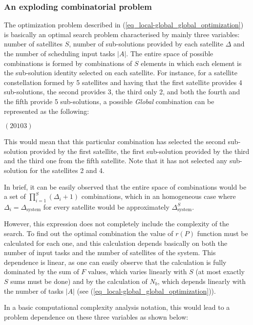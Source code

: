 \subsubsection{An exploding combinatorial problem}

The optimization problem described in (\ref{eq_local-global_global_optimization}) is basically an optimal search problem characterised by mainly three variables: number of satellites $S$, number of sub-solutions provided by each satellite $\Delta$ and the number of scheduling input tasks $|A|$. The entire space of possible combinations is formed by combinations of $S$ elements in which each element is the sub-solution identity selected on each satellite. For instance, for a satellite constellation formed by 5 satellites and having that the first satellite provides 4 sub-solutions, the second provides 3, the third only 2, and both the fourth and the fifth provide 5 sub-solutions, a possible \emph{Global} combination can be represented as the following:

\begin{center}
$ \left(2 0 1 0 3\right) $
\end{center}

This would mean that this particular combination has selected the second sub-solution provided by the first satellite, the first sub-solution provided by the third and the third one from the fifth satellite. Note that it has not selected any sub-solution for the satellites 2 and 4.

In brief, it can be easily observed that the entire space of combinations would be a set of $\prod_{i=1}^{S}{\left(\Delta_i + 1\right)}$ combinations, which in an homogeneous case where $\Delta_i = \Delta_{\text{system}}$ for every satellite would be approximately $\Delta_{\text{system}}^S$.

However, this expression does not completely include the complexity of the search. To find out the optimal combination the value of $r(P)$ function must be calculated for each one, and this calculation depends basically on both the number of input tasks and the number of satellites of the system. This dependence is linear, as one can easily observe that the calculation is fully dominated by the sum of $F$ values, which varies linearly with $S$ (at most exactly $S$ sums must be done) and by the calculation of $N_b$, which depends linearly with the number of tasks $|A|$ (see (\ref{eq_local-global_global_optimization})).

In a basic computational complexity analysis notation, this would lead to a problem dependence on these three variables as shown below:

